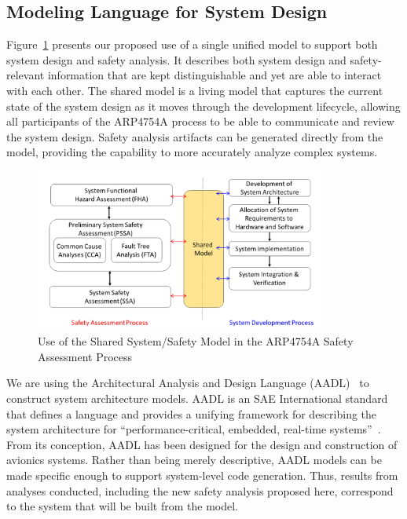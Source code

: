 \subsection{Modeling Language for System Design}
\label{subsec:aadl-agree}
Figure~\ref{fig:proposed_safety_process} presents our proposed use of a single unified model to support both system design and safety analysis. It describes both system design and safety-relevant information 
that are kept distinguishable and yet are able to interact with each other. The shared model is a living model that captures the current state of the system design as it moves through the development lifecycle, allowing all participants of the ARP4754A process to be able to communicate and review the system design. Safety analysis artifacts can be generated directly from the model, 
providing
the capability to more accurately analyze complex systems.

\begin{figure}[t!]
	
	\centering
	\includegraphics[trim=0 5 0 5,clip,width=0.85\textwidth]{images/process3.png}
	
	\caption{Use of the Shared System/Safety Model in the ARP4754A Safety Assessment Process}
	\label{fig:proposed_safety_process}
\end{figure}

We are using the Architectural Analysis and Design Language (AADL)~\cite{FeilerModelBasedEngineering2012} to construct system architecture models.  AADL is an SAE International standard that defines a language and provides a unifying framework for describing the system architecture for ``performance-critical, embedded, real-time systems''~\cite{AADL_Standard}. From its conception, AADL has been designed for the design and construction of avionics systems.  
Rather than being merely descriptive, AADL models can be made specific enough to support system-level code generation.  Thus, results from analyses conducted, including the new safety analysis proposed here, correspond to the system that will be built from the model.  

